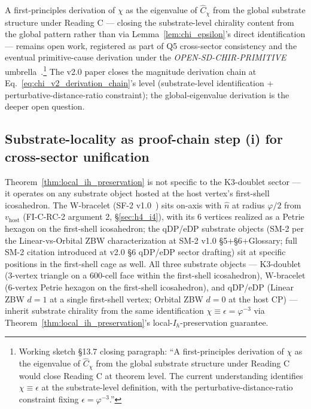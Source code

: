 \documentclass[11pt,letterpaper]{article}
\newcommand{\phig}{\varphi}
\newcommand{\Cchi}{\hat{C}_\chi}
\begin{document}
A first-principles derivation of $\chi$ as the eigenvalue of $\Cchi$ from the global substrate structure under Reading C --- closing the substrate-level chirality content from the global pattern rather than via Lemma~\ref{lem:chi_epsilon}'s direct identification --- remains open work, registered as part of Q5 cross-sector consistency and the eventual primitive-cause derivation under the \emph{OPEN-SD-CHIR-PRIMITIVE} umbrella~\cite{abshier_research_frontier}.\footnote{Working sketch \S13.7 closing paragraph: ``A first-principles derivation of $\chi$ as the eigenvalue of $\Cchi$ from the global substrate structure under Reading C would close Reading C at theorem level. The current understanding identifies $\chi \equiv \epsilon$ at the substrate-level definition, with the perturbative-distance-ratio constraint fixing $\epsilon = \phig^{-3}$.''} The v2.0 paper closes the magnitude derivation chain at Eq.~\eqref{eq:chi_v2_derivation_chain}'s level (substrate-level identification + perturbative-distance-ratio constraint); the global-eigenvalue derivation is the deeper open question.

\subsection{Substrate-locality as proof-chain step (i) for cross-sector unification}\label{sec:locality_as_unification_step}

Theorem~\ref{thm:local_ih_preservation} is not specific to the K3-doublet sector --- it operates on any substrate object hosted at the host vertex's first-shell icosahedron. The W-bracelet (SF-2 v1.0~\cite{abshier_sf2}) sits on-axis with $\hat{n}$ at radius $\phig/2$ from $v_{\text{host}}$ (FI-C-RC-2 argument 2, \S\ref{sec:h4_i4}), with its 6 vertices realized as a Petrie hexagon on the first-shell icosahedron; the qDP/eDP substrate objects (SM-2 per the Linear-vs-Orbital ZBW characterization at SM-2 v1.0 \S5+\S6+Glossary; full SM-2 citation introduced at v2.0 \S6 qDP/eDP sector drafting) sit at specific positions in the first-shell cage as well. All three substrate objects --- K3-doublet (3-vertex triangle on a 600-cell face within the first-shell icosahedron), W-bracelet (6-vertex Petrie hexagon on the first-shell icosahedron), and qDP/eDP (Linear ZBW $d=1$ at a single first-shell vertex; Orbital ZBW $d=0$ at the host CP) --- inherit substrate chirality from the same identification $\chi \equiv \epsilon = \phig^{-3}$ via Theorem~\ref{thm:local_ih_preservation}'s local-$I_h$-preservation guarantee.
\end{document}

